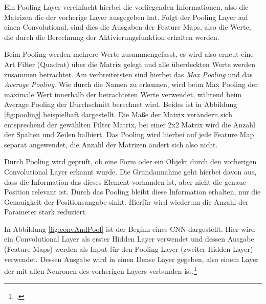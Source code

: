Ein Pooling Layer vereinfacht hierbei die vorliegenden Informationen, also die Matrizen die der vorherige Layer ausgegeben hat. Folgt der Pooling Layer auf einen Convolutional, sind dies die Ausgaben der Feature Maps, also die Werte, die durch die Berechnung der Aktivierungsfunktion erhalten werden.

Beim Pooling werden mehrere Werte zusammengefasst, es wird also erneut eine Art Filter (Quadrat) über die Matrix gelegt und alle überdeckten Werte werden zusammen betrachtet. Am verbreitetsten sind hierbei das \textit{Max Pooling} und das \textit{Average Pooling}. Wie durch die Namen zu erkennen, wird beim Max Pooling der maximale Wert innerhalb der betrachteten Werte verwendet, während beim Average Pooling der Durchschnitt berechnet wird. Beides ist in Abbildung \ref{fig:pooling} beispielhaft dargestellt. Die Maße der Matrix verändern sich entsprechend der gewählten Filter Matrix, bei einer 2x2 Matrix wird die Anzahl der Spalten und Zeilen halbiert.
Das Pooling wird hierbei auf jede Feature Map separat angewendet, die Anzahl der Matrizen ändert sich also nicht. 

Durch Pooling wird geprüft, ob eine Form oder ein Objekt durch den vorherigen Convolutional Layer erkannt wurde. Die Grundannahme geht hierbei davon aus, dass die Information das dieses Element vorhanden ist, aber nicht die genaue Position relevant ist. Durch das Pooling bleibt diese Information erhalten, nur die Genauigkeit der Positionsangabe sinkt. Hierfür wird wiederum die Anzahl der Parameter stark reduziert. 

In Abbildung \ref{fig:convAndPool} ist der Beginn eines \ac{CNN} dargestellt. Hier wird ein Convolutional Layer als erster Hidden Layer verwendet und dessen Ausgabe (Feature Maps) werden als Input für den Pooling Layer (zweiter Hidden Layer) verwendet. Dessen Ausgabe wird in einen Dense Layer gegeben, also einem Layer der mit allen Neuronen des vorherigen Layers verbunden ist.\footcite[Vgl.][S. 169-171]{nielsenNeuralNetworksDeep2015}

